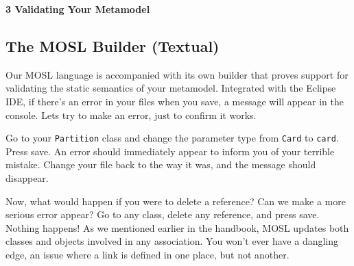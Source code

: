 \newpage
\texHeader

{\bf \Large 3 \hspace{0.5cm}Validating Your Metamodel}

\subsection{ The MOSL Builder (Textual)}

\hypertarget{validation tex}{} Our MOSL language is accompanied with its own builder that proves support for validating the static semantics of your metamodel.
Integrated with the Eclipse IDE, if there's an error in your files when you save, a message will appear in the console. Lets try to make an error, just to
confirm it works.

Go to your \texttt{Partition} class and change the parameter type from \texttt{Card} to \texttt{card}. Press save. An error should immediately appear to inform
you of your terrible mistake. Change your file back to the way it was, and the message should disappear.

Now, what would happen if you were to delete a reference? Can we make a more serious error appear? Go to any class, delete any reference, and press save.
Nothing happens! As we mentioned earlier in the handbook, MOSL updates both classes and objects involved in any association. You won't ever have a dangling
edge, an issue where a link is defined in one place, but not another.

